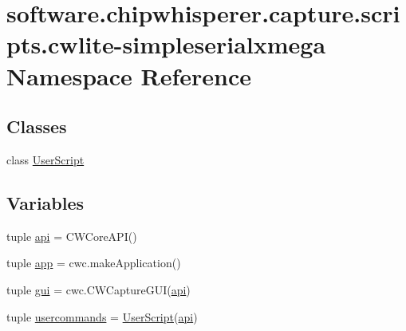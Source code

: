 \hypertarget{namespacesoftware_1_1chipwhisperer_1_1capture_1_1scripts_1_1cwlite-simpleserialxmega}{}\section{software.\+chipwhisperer.\+capture.\+scripts.\+cwlite-\/simpleserialxmega Namespace Reference}
\label{namespacesoftware_1_1chipwhisperer_1_1capture_1_1scripts_1_1cwlite-simpleserialxmega}
\subsection*{Classes}
\begin{DoxyCompactItemize}
\item 
class \hyperlink{classsoftware_1_1chipwhisperer_1_1capture_1_1scripts_1_1cwlite-simpleserialxmega_1_1UserScript}{User\+Script}
\end{DoxyCompactItemize}
\subsection*{Variables}
\begin{DoxyCompactItemize}
\item 
tuple \hyperlink{namespacesoftware_1_1chipwhisperer_1_1capture_1_1scripts_1_1cwlite-simpleserialxmega_ad9f99e430f83981fab58150708526ef5}{api} = C\+W\+Core\+A\+P\+I()
\item 
tuple \hyperlink{namespacesoftware_1_1chipwhisperer_1_1capture_1_1scripts_1_1cwlite-simpleserialxmega_a84c59aaa55025331155121f2a0fb8320}{app} = cwc.\+make\+Application()
\item 
tuple \hyperlink{namespacesoftware_1_1chipwhisperer_1_1capture_1_1scripts_1_1cwlite-simpleserialxmega_ac8850b2029a5965ef8a73182cec204c3}{gui} = cwc.\+C\+W\+Capture\+G\+U\+I(\hyperlink{namespacesoftware_1_1chipwhisperer_1_1capture_1_1scripts_1_1cwlite-simpleserialxmega_ad9f99e430f83981fab58150708526ef5}{api})
\item 
tuple \hyperlink{namespacesoftware_1_1chipwhisperer_1_1capture_1_1scripts_1_1cwlite-simpleserialxmega_aab8230f44c5781d759173502a821b5a2}{usercommands} = \hyperlink{classsoftware_1_1chipwhisperer_1_1capture_1_1scripts_1_1cwlite-simpleserialxmega_1_1UserScript}{User\+Script}(\hyperlink{namespacesoftware_1_1chipwhisperer_1_1capture_1_1scripts_1_1cwlite-simpleserialxmega_ad9f99e430f83981fab58150708526ef5}{api})
\end{DoxyCompactItemize}


